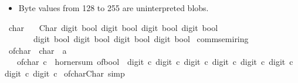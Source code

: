 \begin{isabellebody}
\begin{isamarkuptext}
\begin{itemize}
\item Byte values from 128 to 255 are uninterpreted blobs.%
\end{itemize}%
\end{isamarkuptext}\isamarkuptrue%
%
\isadelimdocument
%
\endisadelimdocument
%
\isatagdocument
%
\isamarkuptrue%
%
\endisatagdocument
{\isafolddocument}%
%
\isadelimdocument
%
\endisadelimdocument
{}\isamarkupfalse%
\ char\ {\isacharequal}{\kern0pt}\isanewline
\ \ Char\ {\isacharparenleft}{\kern0pt}digit{}{\isacharcolon}{\kern0pt}\ bool{\isacharparenright}{\kern0pt}\ {\isacharparenleft}{\kern0pt}digit{}{\isacharcolon}{\kern0pt}\ bool{\isacharparenright}{\kern0pt}\ {\isacharparenleft}{\kern0pt}digit{}{\isacharcolon}{\kern0pt}\ bool{\isacharparenright}{\kern0pt}\ {\isacharparenleft}{\kern0pt}digit{}{\isacharcolon}{\kern0pt}\ bool{\isacharparenright}{\kern0pt}\isanewline
\ \ \ \ \ \ \ {\isacharparenleft}{\kern0pt}digit{}{\isacharcolon}{\kern0pt}\ bool{\isacharparenright}{\kern0pt}\ {\isacharparenleft}{\kern0pt}digit{}{\isacharcolon}{\kern0pt}\ bool{\isacharparenright}{\kern0pt}\ {\isacharparenleft}{\kern0pt}digit{}{\isacharcolon}{\kern0pt}\ bool{\isacharparenright}{\kern0pt}\ {\isacharparenleft}{\kern0pt}digit{}{\isacharcolon}{\kern0pt}\ bool{\isacharparenright}{\kern0pt}\isanewline
\isanewline
{}\isamarkupfalse%
\ comm{\isacharunderscore}{\kern0pt}semiring{\isacharunderscore}{\kern0pt}{}\isanewline
{}\isanewline
\isanewline
{}\isamarkupfalse%
\ of{\isacharunderscore}{\kern0pt}char\ {\isacharcolon}{\kern0pt}{\isacharcolon}{\kern0pt}\ {\isacartoucheopen}char\ {\isasymRightarrow}\ {\isacharprime}{\kern0pt}a{\isacartoucheclose}\isanewline
\ \ \ {\isacartoucheopen}of{\isacharunderscore}{\kern0pt}char\ c\ {\isacharequal}{\kern0pt}\ horner{\isacharunderscore}{\kern0pt}sum\ of{\isacharunderscore}{\kern0pt}bool\ {}\ {\isacharbrackleft}{\kern0pt}digit{}\ c{\isacharcomma}{\kern0pt}\ digit{}\ c{\isacharcomma}{\kern0pt}\ digit{}\ c{\isacharcomma}{\kern0pt}\ digit{}\ c{\isacharcomma}{\kern0pt}\ digit{}\ c{\isacharcomma}{\kern0pt}\ digit{}\ c{\isacharcomma}{\kern0pt}\ digit{}\ c{\isacharcomma}{\kern0pt}\ digit{}\ c{\isacharbrackright}{\kern0pt}{\isacartoucheclose}\isanewline
\isanewline
{}\isamarkupfalse%
\ of{\isacharunderscore}{\kern0pt}char{\isacharunderscore}{\kern0pt}Char\ {\isacharbrackleft}{\kern0pt}simp{\isacharbrackright}{\kern0pt}{\isacharcolon}{\kern0pt}\isanewline

\end{isabellebody}
